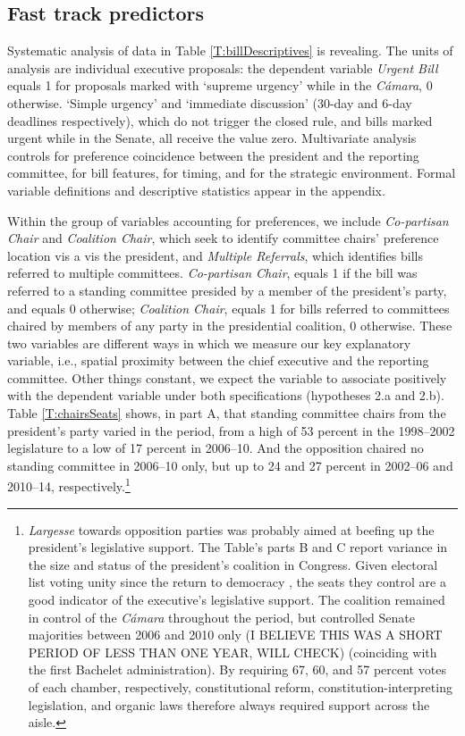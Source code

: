 \documentclass[letter,12pt]{article}
\begin{document}
\subsection{Fast track predictors}

Systematic analysis of data in Table \ref{T:billDescriptives} is revealing. The units of analysis are individual executive proposals: the dependent variable \emph{Urgent Bill} equals 1 for proposals marked with `supreme urgency' while in the \emph{Cámara}, 0 otherwise. `Simple urgency' and `immediate discussion' (30-day and 6-day deadlines respectively), which do not trigger the closed rule, and bills marked urgent while in the Senate, all receive the value zero. Multivariate analysis controls for preference coincidence between the president and the reporting committee, for bill features, for timing, and for the strategic environment. Formal variable definitions and descriptive statistics appear in the appendix.

Within the group of variables accounting for preferences, we include \emph{Co-partisan Chair} and \emph{Coalition Chair}, which seek to identify committee chairs' preference location vis a vis the president, and \emph{Multiple Referrals}, which identifies bills referred to multiple committees. \emph{Co-partisan Chair}, equals 1 if the bill was referred to a standing committee presided by a member of the president's party, and equals 0 otherwise; \emph{Coalition Chair}, equals 1 for bills referred to committees chaired by members of any party in the presidential coalition, 0 otherwise. These two variables are different ways in which we measure our key explanatory variable, i.e., spatial proximity between the chief executive and the reporting committee. Other things constant, we expect the variable to associate positively with the dependent variable under both specifications (hypotheses 2.a and 2.b). Table \ref{T:chairsSeats} shows, in part A, that standing committee chairs from the president's party varied in the period, from a high of 53 percent in the 1998--2002 legislature to a low of 17 percent in 2006--10. And the opposition chaired no standing committee in 2006--10 only, but up to 24 and 27 percent in 2002--06 and 2010--14, respectively.\footnote{\emph{Largesse} towards opposition parties was probably aimed at beefing up the president's legislative support. The Table's parts B and C report variance in the size and status of the president's coalition in Congress. Given electoral list voting unity since the return to democracy \citep{carey.2002,aleman.saiegh.coalUnityChile.2007}, the seats they control are a good indicator of the executive's legislative support. The coalition remained in control of the \emph{Cámara} throughout the period, but controlled Senate majorities between 2006 and 2010 only (I BELIEVE THIS WAS A SHORT PERIOD OF LESS THAN ONE YEAR, WILL CHECK) (coinciding with the first Bachelet administration). By requiring 67, 60, and 57 percent votes of each chamber, respectively, constitutional reform, constitution-interpreting legislation, and organic laws therefore always required support across the aisle.} 
\end{document}
